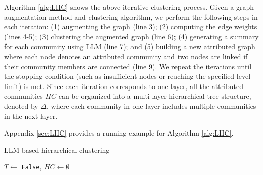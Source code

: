 Algorithm \ref{alg:LHC} shows the above iterative clustering process.
%
Given a graph augmentation method and clustering algorithm, we perform the following steps in each iteration:
(1) augmenting the graph (line 3);
(2) computing the edge weights (lines 4-5);
(3) clustering the augmented graph (line 6);
(4) generating a summary for each community using LLM (line 7);
and (5) building a new attributed graph where each node denotes an attributed community and two nodes are linked if their community members are connected (line 9).
%
We repeat the iterations until the stopping condition (such as insufficient nodes or reaching the specified level limit) is met.
%
Since each iteration corresponds to one layer, all the attributed communities $HC$ can be organized into a multi-layer hierarchical tree structure, denoted by $\Delta$, where each community in one layer includes multiple communities in the next layer.

Appendix \ref{sec:LHC} provides a running example for Algorithm \ref{alg:LHC}.

\begin{algorithm}[ht]
  \caption{LLM-based hierarchical clustering}
  \label{alg:LHC}
  \small
    $T\gets$ {\tt False}, ${HC}\gets \emptyset$\;
\end{algorithm}






